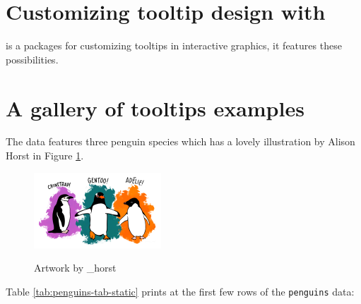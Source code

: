 \section{\texorpdfstring{Customizing tooltip design with }{Customizing tooltip design with }}\label{customizing-tooltip-design-with}

 is a packages for customizing tooltips in interactive graphics, it features these possibilities.

\section{A gallery of tooltips examples}\label{a-gallery-of-tooltips-examples}

The  data \citep{palmerpenguins} features three penguin species which has a lovely illustration by Alison Horst in Figure \ref{fig:penguins-alison}.

\begin{figure}
\includegraphics[width=1\linewidth,height=0.3\textheight,alt={A picture of three different penguins with their species: Chinstrap, Gentoo, and Adelie. }]{figures/penguins} \caption{Artwork by \@allison\_horst}\label{fig:penguins-alison}
\end{figure}

Table \ref{tab:penguins-tab-static} prints at the first few rows of the \texttt{penguins} data:

